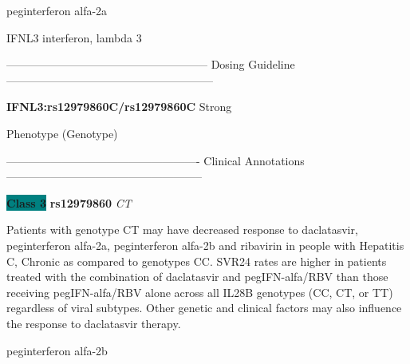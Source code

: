 \documentclass{resume} %
\begin{document}
\begin{rSection}{ peginterferon alfa-2a }
\begin{rSubsection}{ IFNL3 }{ interferon, lambda 3 }{}{}
\item[]
\item[] ------------------------------------------------------ Dosing Guideline --------------------------------------------------------\newline
\item[]
\item[] \textbf{ IFNL3:rs12979860C/rs12979860C } Strong
\item[] Phenotype (Genotype)\newline
\item[] 
\item[] ---------------------------------------------------- Clinical Annotations -----------------------------------------------------\newline
\item \textbf{\colorbox{teal} {Class 3}} \textbf{ rs12979860 } \textit{ CT }
\item[] Patients with genotype CT may have decreased response to daclatasvir, peginterferon alfa-2a, peginterferon alfa-2b and ribavirin in people with Hepatitis C, Chronic as compared to genotypes CC. SVR24 rates are higher in patients treated with the combination of daclatasvir and pegIFN-alfa/RBV than those receiving pegIFN-alfa/RBV alone across all IL28B genotypes (CC, CT, or TT) regardless of viral subtypes. Other genetic and clinical factors may also influence the response to daclatasvir therapy.
\end{rSubsection}

\end{rSection}\begin{rSection}{ peginterferon alfa-2b }
\item[]


\end{rSection}
\end{document}
